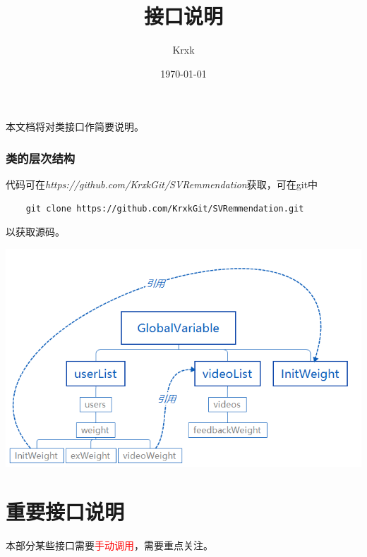 \documentclass{article}
\begin{document}
\pagestyle{fancy}
\title{接口说明}
\author{Krxk}
\date{\today}
\maketitle


本文档将对类接口作简要说明。
\tableofcontents
\newpage
\section{类的层次结构}
代码可在\emph{https://github.com/KrxkGit/SVRemmendation}获取，可在git中
\begin{lstlisting}
    git clone https://github.com/KrxkGit/SVRemmendation.git
\end{lstlisting}
以获取源码。

\begin{center}
    \includegraphics[scale=0.8]{../类结构.png}
\end{center}

\part{重要接口说明}
本部分某些接口需要\textcolor{red}{手动调用}，需要重点关注。
\end{document}
